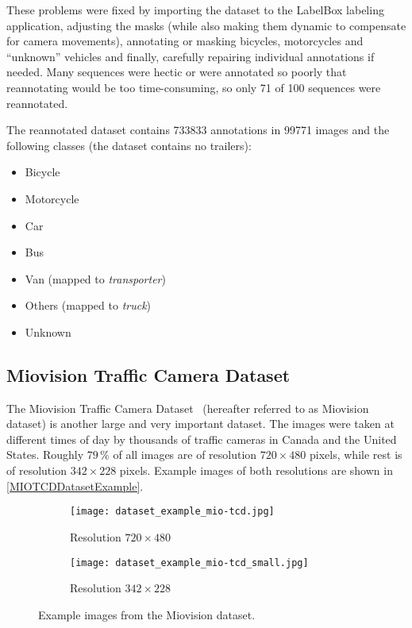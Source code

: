 These problems were fixed by importing the dataset to the LabelBox labeling
application, adjusting the masks (while also making them dynamic to compensate
for camera movements), annotating or masking bicycles, motorcycles and
``unknown'' vehicles and finally, carefully repairing individual annotations if
needed. Many sequences were hectic or were annotated so poorly that reannotating
would be too time-consuming, so only 71 of 100 sequences were reannotated.

The reannotated dataset contains \num{733833} annotations in \num{99771}
images and the following classes (the dataset contains no trailers):
\begin{itemize}
    \item Bicycle
    \item Motorcycle
    \item Car
    \item Bus
    \item Van (mapped to \textit{transporter})
    \item Others (mapped to \textit{truck})
    \item Unknown
\end{itemize}


\subsection{Miovision Traffic Camera Dataset}

The Miovision Traffic Camera Dataset~\cite{MIO2018} (hereafter referred to
as Miovision dataset) is another large and very important dataset. The images
were taken at different times of day by thousands of traffic cameras in Canada
and the United States. Roughly $79\,\%$ of all images are of resolution $720
\times 480$ pixels, while rest is of
resolution $342 \times 228$ pixels. Example images of both resolutions are shown
in \autoref{MIOTCDDatasetExample}.

\begin{figure}[t]
    \centering
    \begin{subfigure}[b]{0.475\textwidth}
        \texttt{[image: dataset\_example\_mio-tcd.jpg]}
        \caption{Resolution $720 \times 480$}
    \end{subfigure}
    \begin{subfigure}[b]{0.475\textwidth}
        \texttt{[image: dataset\_example\_mio-tcd\_small.jpg]}
        \caption{Resolution $342 \times 228$}
    \end{subfigure}
    \caption{Example images from the Miovision dataset.}
    \label{MIOTCDDatasetExample}
\end{figure}

